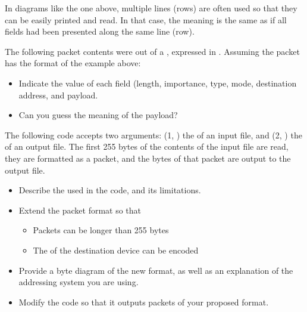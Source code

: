 \begin{remark}
In diagrams like the one above, multiple lines (rows) are often used so that they can be
easily printed and read. In that case, the meaning is the same as if all fields had been
presented along the same line (row).
\end{remark}

\begin{exercise}
The following packet contents were  out of a ,
expressed in . Assuming the packet has the format of the example above:
% 
\begin{itemize}
\item Indicate the value of each field (length, importance, type, mode, destination address, and payload.
\item Can you guess the meaning of the payload?
\end{itemize}
% 
\begin{center}
\end{center}
\end{exercise}

\begin{exercise}
The following code accepts two arguments: (1, ) the  of an input file, 
and (2, ) the  of an output file.
The first 255 bytes of the contents of the input file are read, 
they are formatted as a packet, and the bytes of that packet
are output to the output file.

\begin{center}
\end{center}

\begin{itemize}
\item Describe the  used in the code, and its limitations.

\item Extend the packet format so that 
 \begin{itemize}
   \item Packets can be longer than 255 bytes
   \item The  of the destination device can be encoded
  \end{itemize}
  
\item Provide a byte diagram of the new format, 
as well as an explanation of the addressing system you are using.

\item Modify the code so that it outputs packets of your proposed format.
\end{itemize}
\end{exercise}

